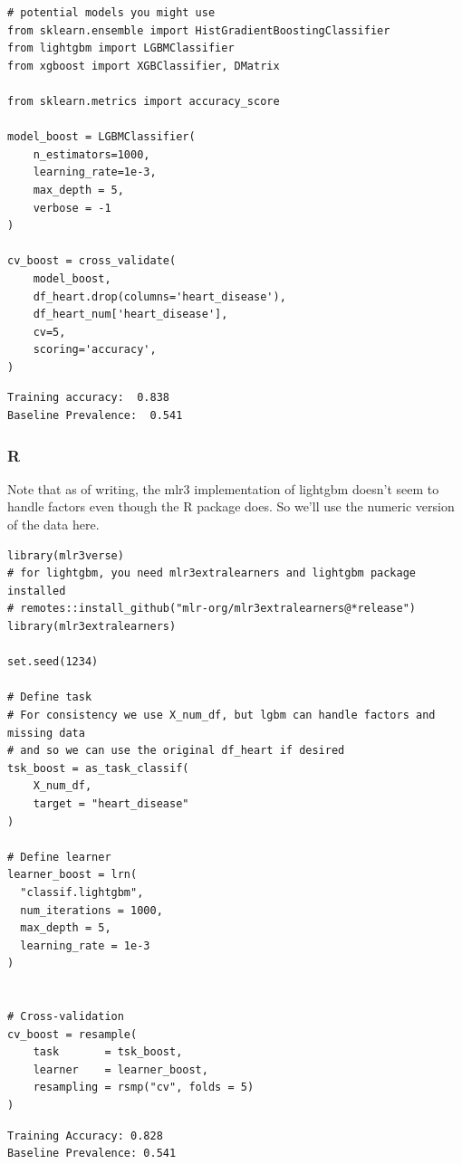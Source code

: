 \documentclass[
  letterpaper,
]{krantz}
\begin{document}
\begin{verbatim}
# potential models you might use
from sklearn.ensemble import HistGradientBoostingClassifier
from lightgbm import LGBMClassifier
from xgboost import XGBClassifier, DMatrix

from sklearn.metrics import accuracy_score

model_boost = LGBMClassifier(
    n_estimators=1000,
    learning_rate=1e-3,
    max_depth = 5,
    verbose = -1
)

cv_boost = cross_validate(
    model_boost,
    df_heart.drop(columns='heart_disease'),
    df_heart_num['heart_disease'],
    cv=5,
    scoring='accuracy',
)
\end{verbatim}

\begin{verbatim}
Training accuracy:  0.838 
Baseline Prevalence:  0.541
\end{verbatim}

\subsubsection{R}

Note that as of writing, the mlr3 implementation of lightgbm doesn't
seem to handle factors even though the R package does. So we'll use the
numeric version of the data here.

\begin{verbatim}
library(mlr3verse)
# for lightgbm, you need mlr3extralearners and lightgbm package installed
# remotes::install_github("mlr-org/mlr3extralearners@*release")
library(mlr3extralearners) 

set.seed(1234)

# Define task
# For consistency we use X_num_df, but lgbm can handle factors and missing data 
# and so we can use the original df_heart if desired
tsk_boost = as_task_classif(
    X_num_df,                 
    target = "heart_disease"
)

# Define learner
learner_boost = lrn(
  "classif.lightgbm",
  num_iterations = 1000,
  max_depth = 5,
  learning_rate = 1e-3
)


# Cross-validation
cv_boost = resample(
    task       = tsk_boost,
    learner    = learner_boost,
    resampling = rsmp("cv", folds = 5)
)
\end{verbatim}

\begin{verbatim}
Training Accuracy: 0.828
Baseline Prevalence: 0.541
\end{verbatim}
\end{document}
